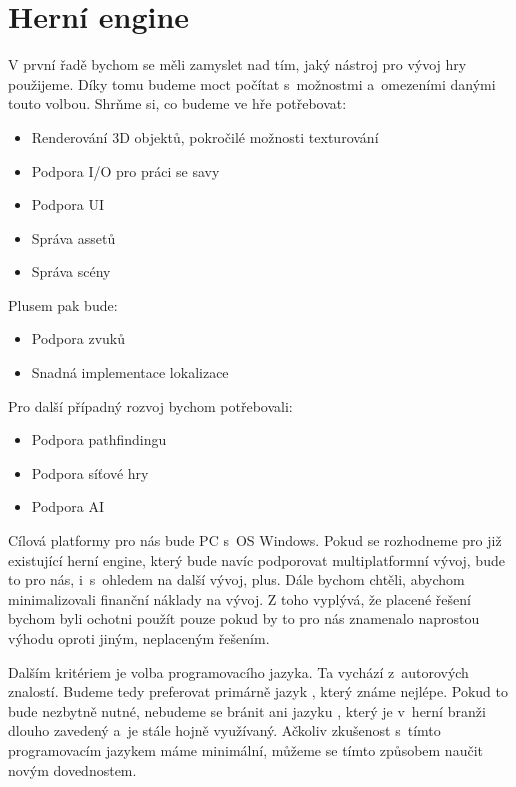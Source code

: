 
\section{Herní engine}
V první řadě bychom se měli zamyslet nad tím, jaký nástroj pro vývoj hry použijeme. Díky tomu budeme moct počítat s~možnostmi a~omezeními danými touto volbou. Shrňme si, co budeme ve hře potřebovat:

\begin{itemize}
	\item Renderování 3D objektů, pokročilé možnosti texturování
	\item Podpora I/O pro práci se savy
	\item Podpora UI
	\item Správa assetů
	\item Správa scény
\end{itemize}

Plusem pak bude:

\begin{itemize}
	\item Podpora zvuků
	\item Snadná implementace lokalizace
\end{itemize}

Pro další případný rozvoj bychom potřebovali:

\begin{itemize}
	\item Podpora pathfindingu
	\item Podpora síťové hry
	\item Podpora AI
\end{itemize}

Cílová platformy pro nás bude PC s~OS Windows. Pokud se rozhodneme pro již existující herní engine, který bude navíc podporovat multiplatformní vývoj, bude to pro nás, i~s~ohledem na další vývoj, plus. Dále bychom chtěli, abychom minimalizovali finanční náklady na vývoj. Z toho vyplývá, že placené řešení bychom byli ochotni použít pouze pokud by to pro nás znamenalo naprostou výhodu oproti jiným, neplaceným řešením.

Dalším kritériem je volba programovacího jazyka. Ta vychází z~autorových znalostí. Budeme tedy preferovat primárně jazyk \CS{}, který známe nejlépe. Pokud to bude nezbytně nutné, nebudeme se bránit ani jazyku \CPP{}, který je v~herní branži dlouho zavedený a~je stále hojně využívaný. Ačkoliv zkušenost s~tímto programovacím jazykem máme minimální, můžeme se tímto způsobem naučit novým dovednostem.

